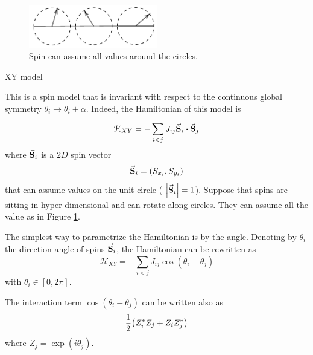 \documentclass[../../Main/Main.tex]{subfiles}
\begin{document}
\begin{figure}[h!]
\centering
\includegraphics[width=0.5\textwidth]{./img/2.pdf}
\caption{\label{fig:10_2} Spin can assume all values around the circles.}
\end{figure}

\begin{example}{XY model}{}


This is a spin model that is invariant with respect to the continuous global symmetry
\( \theta _i \rightarrow \theta _i + \alpha  \).
Indeed, the Hamiltonian of this model is
\begin{equation}
  \mathcal{H}_{XY} = - \sum_{i<j}^{} J_{ij} \va{S}_i \vdot \va{S}_j
\end{equation}
where \(\va{S}_i  \) is a \( 2D \) spin vector
\begin{equation*}
  \va{S}_i = (S_{x_i}, S_{y_i})
\end{equation*}
that can assume values on the unit circle ( \(  \abs{\va{S}_i} =1 \)).
Suppose that spins are sitting in hyper dimensional and can rotate along circles. They can assume all the value as in Figure \ref{fig:10_2}.

The simplest way to parametrize the Hamiltonian is by the angle.
Denoting by \( \theta _i \) the direction angle of spins \( \va{S}_i \), the Hamiltonian can be rewritten as
\begin{equation}
  \mathcal{H}_{XY} = - \sum_{i<j}^{} J_{ij} \cos(\theta _i - \theta _j)
\end{equation}
with \( \theta _i \in [0,2 \pi ] \).

\begin{remark}
The interaction term \( \cos(\theta _i - \theta _j)  \) can be written also as
\begin{equation*}
  \frac{1}{2} \qty(Z_i^* Z_j + Z_i Z_j^*)
\end{equation*}
where \(   Z_j = \exp (i \theta _j) \).
\end{remark}


\end{example}
\end{document}
